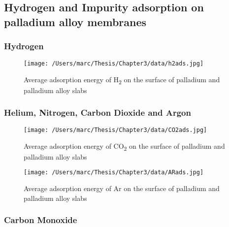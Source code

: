 \subsection{Hydrogen and Impurity adsorption on palladium alloy membranes}
\subsubsection{Hydrogen}

\begin{landscape}
\begin{figure}
    \centering
    \texttt{[image: /Users/marc/Thesis/Chapter3/data/h2ads.jpg]}
    \caption{Average adsorption energy of H\textsubscript{2} on the surface of palladium and palladium alloy slabs}
    \label{h2ads}
  \end{figure}

\end{landscape}
\subsubsection{Helium, Nitrogen, Carbon Dioxide and Argon}
\begin{landscape}
    \begin{figure}
        \centering
        \texttt{[image: /Users/marc/Thesis/Chapter3/data/CO2ads.jpg]}
        \caption{Average adsorption energy of CO\textsubscript{2} on the surface of palladium and palladium alloy slabs}
        \label{h2ads}
      \end{figure}
    
    \end{landscape}

    \begin{landscape}
        \begin{figure}
            \centering
            \texttt{[image: /Users/marc/Thesis/Chapter3/data/ARads.jpg]}
            \caption{Average adsorption energy of Ar on the surface of palladium and palladium alloy slabs}
            \label{h2ads}
          \end{figure}
        
        \end{landscape}
\subsubsection{Carbon Monoxide}

